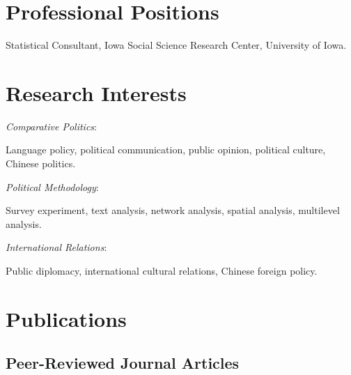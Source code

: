 \documentclass[10.5pt,]{article}
\providecommand{\tightlist}{%
	\setlength{\itemsep}{0pt}\setlength{\parskip}{0pt}}
\renewenvironment{itemize}{
	\begin{list}{}{
			\setlength{\leftmargin}{1.5em}
		}
	}{
	\end{list}
}
\begin{document}
\section{Professional Positions}\label{professional-positions}

\begin{itemize}
\tightlist
\item
  Statistical Consultant, Iowa Social Science Research Center,
  University of Iowa.
\end{itemize}

\section{Research Interests}\label{research-interests}

\begin{itemize}
\tightlist
\item
  \emph{Comparative Politics}:

  \begin{itemize}
  \tightlist
  \item
    Language policy, political communication, public opinion, political
    culture, Chinese politics.
  \end{itemize}
\item
  \emph{Political Methodology}:

  \begin{itemize}
  \tightlist
  \item
    Survey experiment, text analysis, network analysis, spatial
    analysis, multilevel analysis.
  \end{itemize}
\item
  \emph{International Relations}:

  \begin{itemize}
  \tightlist
  \item
    Public diplomacy, international cultural relations, Chinese foreign
    policy.
  \end{itemize}
\end{itemize}

\section{Publications}\label{publications}

\subsection{Peer-Reviewed Journal
Articles}\label{peer-reviewed-journal-articles}
\end{document}
